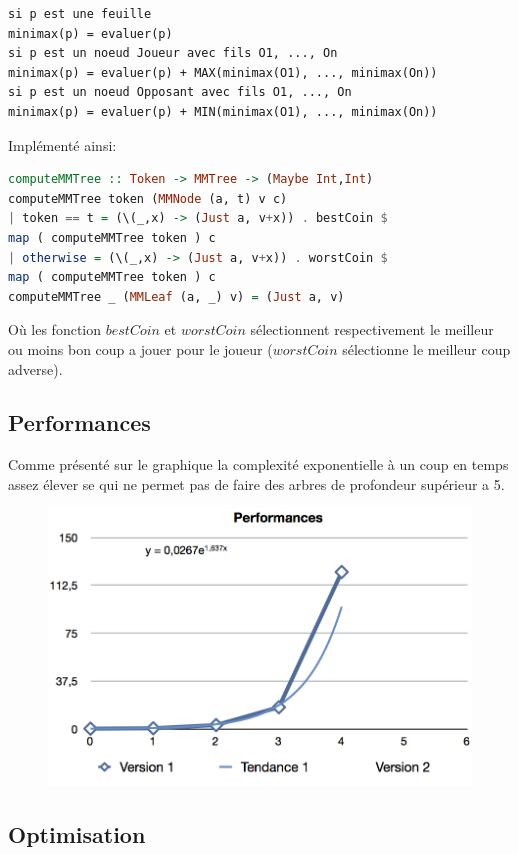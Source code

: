 \documentclass[a4paper]{article}
\begin{document}
\begin{lstlisting}
si p est une feuille
minimax(p) = evaluer(p)
si p est un noeud Joueur avec fils O1, ..., On
minimax(p) = evaluer(p) + MAX(minimax(O1), ..., minimax(On))
si p est un noeud Opposant avec fils O1, ..., On
minimax(p) = evaluer(p) + MIN(minimax(O1), ..., minimax(On))
\end{lstlisting}

Implémenté ainsi:

\begin{lstlisting}[language=haskell]
computeMMTree :: Token -> MMTree -> (Maybe Int,Int)
computeMMTree token (MMNode (a, t) v c)
| token == t = (\(_,x) -> (Just a, v+x)) . bestCoin $
map ( computeMMTree token ) c
| otherwise = (\(_,x) -> (Just a, v+x)) . worstCoin $
map ( computeMMTree token ) c
computeMMTree _ (MMLeaf (a, _) v) = (Just a, v)
\end{lstlisting}

Où les fonction $bestCoin$ et $worstCoin$ sélectionnent respectivement le meilleur ou moins bon coup a jouer pour le joueur ($worstCoin$ sélectionne le meilleur coup adverse).
\subsection{Performances}

Comme présenté sur le graphique  la complexité exponentielle à un coup en temps assez élever se qui ne permet pas de faire des arbres de profondeur supérieur a 5.

\begin{figure}[h!]
\includegraphics[scale=0.88]{Performance}
\end{figure}

\subsection{Optimisation}
\end{document}

